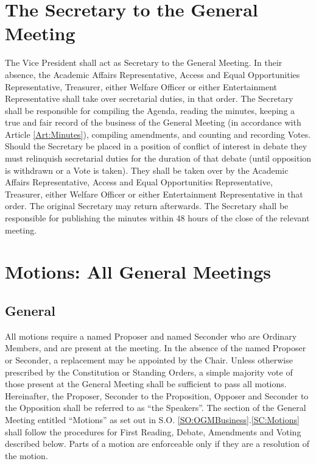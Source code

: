 \section{The Secretary to the General Meeting} \label{gm:secretary}
\npara The Vice President shall act as Secretary to the General Meeting. In their absence, the Academic Affairs Representative, Access and Equal Opportunities Representative, Treasurer, either Welfare Officer or either Entertainment Representative shall take over secretarial duties, in that order.
\npara The Secretary shall be responsible for compiling the Agenda, reading the minutes, keeping a true and fair record of the business of the General Meeting (in accordance with Article \ref{Art:Minutes}), compiling amendments, and counting and recording Votes.
\npara Should the Secretary be placed in a position of conflict of interest in debate they must relinquish secretarial duties for the duration of that debate (until opposition is withdrawn or a Vote is taken). They shall be taken over by the Academic Affairs Representative, Access and Equal Opportunities Representative, Treasurer, either Welfare Officer or either Entertainment Representative in that order. The original Secretary may return afterwards.
\npara The Secretary shall be responsible for publishing the minutes within 48 hours of the close of the relevant meeting.
\section{Motions: All General Meetings}
\subsection{General}
\npara All motions require a named Proposer and named Seconder who are Ordinary Members, and are present at the meeting. In the absence of the named Proposer or Seconder, a replacement may be appointed by the Chair.
\npara Unless otherwise prescribed by the Constitution or Standing Orders, a simple majority vote of those present at the General Meeting shall be sufficient to pass all motions.
\npara Hereinafter, the Proposer, Seconder to the Proposition, Opposer and Seconder to the Opposition shall be referred to as ``the Speakers''.
\npara The section of the General Meeting entitled ``Motions'' as set out in S.O. \ref{SO:OGMBusiness}.\ref{SC:Motions} shall follow the procedures for First Reading, Debate, Amendments and Voting described below.
\npara Parts of a motion are enforceable only if they are a resolution of the motion.


